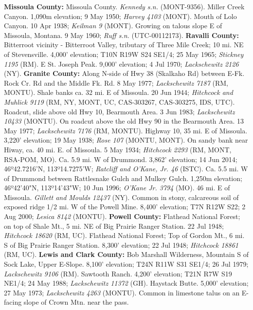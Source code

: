   \textbf{Missoula County:}
Missoula County. \textit{Kennedy s.n.} (MONT-9356).
Miller Creek Canyon. 1,090m elevation; 9 May 1950; \textit{Harvey 4103} (MONT).
Mouth of Lolo Canyon. 10 Apr 1938; \textit{Keilman 9} (MONT).
Growing on talous slope E of Missoula, Montana. 9 May 1960;
\textit{Ruff s.n.} (UTC-00112173).
  \textbf{Ravalli County:}
Bitterroot vicinity - Bitterroot Valley, tributary of Three Mile Creek; 10 mi.
NE of Stevensville. 4,000' elevation; T10N R19W S24 SE1/4; 25 May 1965;
\textit{Stickney 1195} (RM).
E St. Joseph Peak. 9,000' elevation; 4 Jul 1970;
\textit{Lackschewitz 2126} (NY).
  \textbf{Granite County:}
Along N-side of Hwy 38 (Skalkaho Rd) between E-Fk. Rock Cr. Rd and the Middle
Fk. Rd. 8 May 1977; \textit{Lackschewitz 7187} (RM, MONTU).
Shale banks ca. 32 mi. E of Missoula. 20 Jun 1944;
\textit{Hitchcock and Muhlick 9119}
(RM, NY, MONT, UC, CAS-303267, CAS-303275, IDS, UTC).
Roadcut, slide above old Hwy 10, Bearmouth Area. 3 Jun 1983;
\textit{Lackschewitz 10433} (MONTU).
On roadcut above the old Hwy 90 in the Bearmouth Area. 13 May 1977;
\textit{Lackschewitz 7176} (RM, MONTU).
Highway 10, 35 mi. E of Missoula. 3,220' elevation; 19 May 1938;
\textit{Rose 107} (MONTU, MONT).
On sandy bank near Hiway, ca. 40 mi. E. of Missoula. 5 May 1934;
\textit{Hitchcock 2293} (RM, MONT, RSA-POM, MO).
Ca. 5.9 mi. W of Drummond. 3,862' elevation; 14 Jun 2014; 46º42.7216'N,
113º14.7275'W; \textit{Ratcliff and O'Kane, Jr. 46} (ISTC).
Ca. 5.5 mi. W of Drummond between Rattlesnake Gulch and Mulkey Gulch. 1,250m
elevation; 46º42'40"N, 113º14'43"W; 10 Jun 1996; \textit{O'Kane Jr. 3794} (MO).
46 mi. E of Missoula. \textit{Gillett and Moulds 12437} (NY).
Common in stony, calcareous soil of exposed ridge 1/2 mi. W of the Powell Mine.
8,400' elevation; T7N R12W S22; 2 Aug 2000; \textit{Lesica 8142} (MONTU).
  \textbf{Powell County:}
Flathead National Forest; on top of Shale Mt., 5 mi. NE of Big Prairie Ranger
Station. 22 Jul 1948; \textit{Hitchcock 18620} (RM, UC).
Flathead National Forest; Top of Gordon Mt., 6 mi. S of Big Prairie Ranger
Station. 8,300' elevation; 22 Jul 1948; \textit{Hitchcock 18861} (RM, UC).
  \textbf{Lewis and Clark County:}
Bob Marshall Wilderness, Mountain S of Sock Lake, Upper E-Slope.
8,100' elevation; T24N R11W S31 SE1/4; 26 Jul 1979;
\textit{Lackschewitz 9106} (RM).
Sawtooth Ranch. 4,200' elevation; T21N R7W S19 NE1/4; 24 May 1988;
\textit{Lackschewitz 11372} (GH).
Haystack Butte. 5,000' elevation; 27 May 1973;
\textit{Lackschewitz 4263} (MONTU).
Common in limestone talus on an E-facing slope of Crown Mtn. near the pass.
